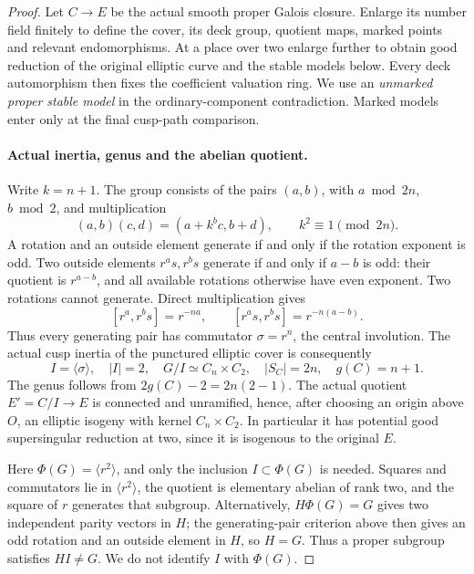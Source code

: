 \begin{proof}
Let \(C\to E\) be the actual smooth proper Galois closure.
Enlarge its number field finitely to define the cover, its deck
group, quotient maps, marked points and relevant endomorphisms.
At a place over two enlarge further to obtain good reduction
of the original elliptic curve and the stable models below.
Every deck automorphism then fixes the coefficient valuation
ring. We use an \emph{unmarked proper stable model} in the
ordinary-component contradiction. Marked models enter only
at the final cusp-path comparison.

\paragraph{Actual inertia, genus and the abelian quotient.}
Write \(k=n+1\). The group consists of the pairs
\((a,b)\), with \(a\bmod2n\), \(b\bmod2\), and multiplication
\[
 (a,b)(c,d)=(a+k^b c,b+d),\qquad k^2\equiv1\pmod{2n}.
                                                        \tag{A.75.2}
\]
A rotation and an outside element generate if and only if
the rotation exponent is odd. Two outside elements
\(r^a s,r^b s\) generate if and only if \(a-b\) is odd:
their quotient is \(r^{a-b}\), and all available rotations
otherwise have even exponent. Two rotations cannot generate.
Direct multiplication gives
\[
 [r^a,r^b s]=r^{-na},\qquad
 [r^a s,r^b s]=r^{-n(a-b)}.                            \tag{A.75.3}
\]
Thus every generating pair has commutator
\(\sigma=r^n\), the central involution. The actual cusp
inertia of the punctured elliptic cover is consequently
\[
 I=\langle\sigma\rangle,\quad |I|=2,\quad
 G/I\simeq C_n\times C_2,
 \quad |S_C|=2n,
 \quad g(C)=n+1.                                      \tag{A.75.4}
\]
The genus follows from \(2g(C)-2=2n(2-1)\).
The actual quotient \(E'=C/I\to E\) is connected and
unramified, hence, after choosing an origin above \(O\),
an elliptic isogeny with kernel \(C_n\times C_2\).
In particular it has potential good supersingular reduction
at two, since it is isogenous to the original \(E\).

Here \(\Phi(G)=\langle r^2\rangle\), and only the inclusion
\(I\subset\Phi(G)\) is needed. Squares and commutators lie
in \(\langle r^2\rangle\), the quotient is elementary
abelian of rank two, and the square of \(r\) generates
that subgroup. Alternatively, \(H\Phi(G)=G\) gives two
independent parity vectors in \(H\); the generating-pair
criterion above then gives an odd rotation and an outside
element in \(H\), so \(H=G\). Thus a proper subgroup
satisfies \(HI\ne G\). We do not identify \(I\) with
\(\Phi(G)\).


\end{proof}
